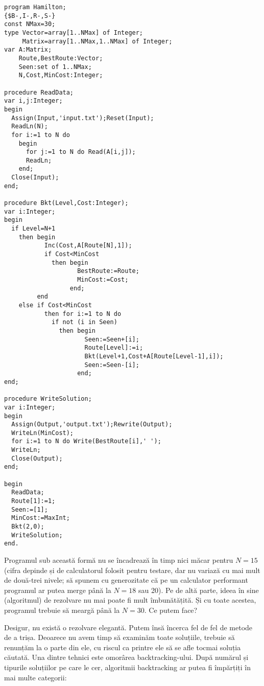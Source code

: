 \begin{verbatim}
program Hamilton;
{$B-,I-,R-,S-}
const NMax=30;
type Vector=array[1..NMax] of Integer;
     Matrix=array[1..NMax,1..NMax] of Integer;
var A:Matrix;
    Route,BestRoute:Vector;
    Seen:set of 1..NMax;
    N,Cost,MinCost:Integer;

procedure ReadData;
var i,j:Integer;
begin
  Assign(Input,'input.txt');Reset(Input);
  ReadLn(N);
  for i:=1 to N do
    begin
      for j:=1 to N do Read(A[i,j]);
      ReadLn;
    end;
  Close(Input);
end;

procedure Bkt(Level,Cost:Integer);
var i:Integer;
begin
  if Level=N+1
    then begin
           Inc(Cost,A[Route[N],1]);
           if Cost<MinCost
             then begin
                    BestRoute:=Route;
                    MinCost:=Cost;
                  end;
         end
    else if Cost<MinCost
           then for i:=1 to N do
             if not (i in Seen)
               then begin
                      Seen:=Seen+[i];
                      Route[Level]:=i;
                      Bkt(Level+1,Cost+A[Route[Level-1],i]);
                      Seen:=Seen-[i];
                    end;
end;

procedure WriteSolution;
var i:Integer;
begin
  Assign(Output,'output.txt');Rewrite(Output);
  WriteLn(MinCost);
  for i:=1 to N do Write(BestRoute[i],' ');
  WriteLn;
  Close(Output);
end;

begin
  ReadData;
  Route[1]:=1;
  Seen:=[1];
  MinCost:=MaxInt;
  Bkt(2,0);
  WriteSolution;
end.
\end{verbatim}

Programul sub această formă nu se încadrează în timp nici măcar pentru $N=15$
(cifra depinde și de calculatorul folosit pentru testare, dar nu variază cu
mai mult de două-trei nivele; să spunem cu generozitate că pe un calculator
performant programul ar putea merge până la $N=18$ sau 20). Pe de altă parte,
ideea în sine (algoritmul) de rezolvare nu mai poate fi mult îmbunătățită. Și
cu toate acestea, programul trebuie să meargă până la $N=30$. Ce putem face?

Desigur, nu există o rezolvare elegantă. Putem însă încerca fel de fel de
metode de a trișa. Deoarece nu avem timp să examinăm toate soluțiile, trebuie
să renunțăm la o parte din ele, cu riscul ca printre ele să se afle tocmai
soluția căutată. Una dintre tehnici este omorârea backtracking-ului. După
numărul și tipurile soluțiilor pe care le cer, algoritmii backtracking ar
putea fi împărțiți în mai multe categorii:

